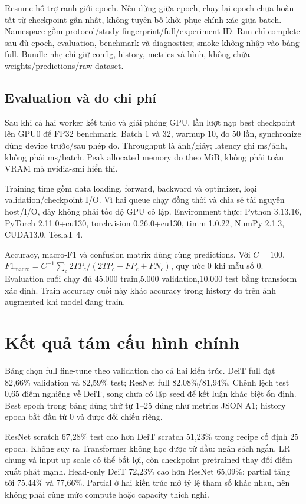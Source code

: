 \documentclass[11pt,a4paper]{article}
\begin{document}
Resume hỗ trợ ranh giới epoch. Nếu dừng giữa epoch, chạy lại epoch chưa hoàn tất từ checkpoint gần nhất, không tuyên bố khôi phục chính xác giữa batch. Namespace gồm protocol/study fingerprint/full/experiment ID. Run chỉ complete sau đủ epoch, evaluation, benchmark và diagnostics; smoke không nhập vào bảng full. Bundle nhẹ chỉ giữ config, history, metrics và hình, không chứa weights/predictions/raw dataset.

\subsection{Evaluation và đo chi phí}
Sau khi cả hai worker kết thúc và giải phóng GPU, lần lượt nạp best checkpoint lên GPU0 để FP32 benchmark. Batch 1 và 32, warmup 10, đo 50 lần, synchronize đúng device trước/sau phép đo. Throughput là ảnh/giây; latency ghi ms/ảnh, không phải ms/batch. Peak allocated memory đo theo MiB, không phải toàn VRAM mà nvidia-smi hiển thị.

Training time gồm data loading, forward, backward và optimizer, loại validation/checkpoint I/O. Vì hai queue chạy đồng thời và chia sẻ tài nguyên host/I/O, đây không phải tốc độ GPU cô lập. Environment thực: Python 3.13.16, PyTorch 2.11.0+cu130, torchvision 0.26.0+cu130, timm 1.0.22, NumPy 2.1.3, CUDA13.0, TeslaT 4.

Accuracy, macro-F1 và confusion matrix dùng cùng predictions. Với $C=100$, $F 1_\text{macro}=C^{-1}\sum_c 2 TP_c/(2 TP_c+FP_c+FN_c)$, quy ước 0 khi mẫu số 0. Evaluation cuối chạy đủ 45.000 train,5.000 validation,10.000 test bằng transform xác định. Train accuracy cuối này khác accuracy trong history đo trên ảnh augmented khi model đang train.
\clearpage

\section{Kết quả tám cấu hình chính}\label{sec:results}


Bảng chọn full fine-tune theo validation cho cả hai kiến trúc. DeiT full đạt 82,66\% validation và 82,59\% test; ResNet full 82,08\%/81,94\%. Chênh lệch test 0,65 điểm nghiêng về DeiT, song chưa có lặp seed để kết luận khác biệt ổn định. Best epoch trong bảng dùng thứ tự 1--25 đúng như metrics JSON A1; history epoch bắt đầu từ 0 và được đối chiếu riêng.

ResNet scratch 67,28\% test cao hơn DeiT scratch 51,23\% trong recipe cố định 25 epoch. Không suy ra Transformer không học được từ đầu: ngân sách ngắn, LR chung và input up scale có thể bất lợi, còn checkpoint pretrained thay đổi điểm xuất phát mạnh. Head-only DeiT 72,23\% cao hơn ResNet 65,09\%; partial tăng tới 75,44\% và 77,66\%. Partial ở hai kiến trúc mở tỷ lệ tham số khác nhau, nên không phải cùng mức compute hoặc capacity thích nghi.
\end{document}
